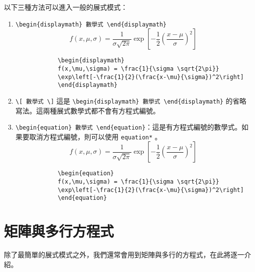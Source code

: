 \documentclass[12pt,a4paper]{report}
\begin{document}
\begin{CJK}{UTF8}{bkai}
以下三種方法可以進入一般的展式模式：
\begin{enumerate}
\item \verb|\begin{displaymath} 數學式 \end{displaymath}|
	\begin{displaymath}
	f(x,\mu,\sigma) = \frac{1}{\sigma \sqrt{2\pi}}\exp\left[-\frac{1}{2}(\frac{x-\mu}{\sigma})^2\right] 
	\end{displaymath}
	\begin{framed}
		\begin{verbatim}
			\begin{displaymath}
			f(x,\mu,\sigma) = \frac{1}{\sigma \sqrt{2\pi}}
			\exp\left[-\frac{1}{2}(\frac{x-\mu}{\sigma})^2\right] 
			\end{displaymath}
		\end{verbatim}
	\end{framed}
\item \verb|\[ 數學式 \]| 這是 \verb|\begin{displaymath} 數學式 \end{displaymath}| 的省略寫法。這兩種展式數學式都不會有方程式編號。

\item \verb|\begin{equation} 數學式 \end{equation}|：這是有方程式編號的數學式。如果要取消方程式編號，則可以使用 \verb|equation*| 。
	\begin{equation}
		f(x,\mu,\sigma) = \frac{1}{\sigma \sqrt{2\pi}}\exp\left[-\frac{1}{2}(\frac{x-\mu}{\sigma})^2\right] 
	\end{equation}
	\begin{framed}
		\begin{verbatim}
			\begin{equation}
			f(x,\mu,\sigma) = \frac{1}{\sigma \sqrt{2\pi}}
			\exp\left[-\frac{1}{2}(\frac{x-\mu}{\sigma})^2\right] 
			\end{equation}
		\end{verbatim}
	\end{framed}
\end{enumerate}

\section{矩陣與多行方程式}
除了最簡單的展式模式之外，我們還常會用到矩陣與多行的方程式，在此將逐一介紹。


\end{CJK}
\end{document}
